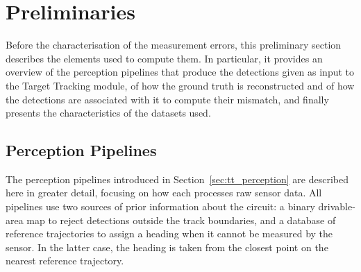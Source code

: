 \section{Preliminaries}
\label{sec:preprocessing}

Before the characterisation of the measurement errors, this preliminary section describes
the elements used to compute them. In particular, it provides an overview of the perception
pipelines that produce the detections given as input to the Target Tracking module, of how the ground truth is reconstructed and of how
the detections are associated with it to compute their mismatch, and finally presents the
characteristics of the datasets used.

\subsection{Perception Pipelines}
\label{sec:pipelines}

The perception pipelines introduced in Section~\ref{sec:tt_perception} are described here in
greater detail, focusing on how each processes raw sensor data.
All pipelines use two sources of prior information about the circuit: a binary drivable-area
map to reject detections outside the track boundaries, and a database of reference
trajectories to assign a heading when it cannot be measured by the sensor. In the latter case,
the heading is taken from the closest point on the nearest reference trajectory.

